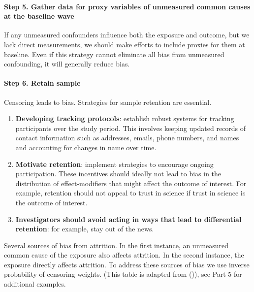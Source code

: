 \documentclass[
  singlecolumn]{article}
\let\oldparagraph\paragraph
\renewcommand{\paragraph}[1]{\oldparagraph{#1}\mbox{}}
\begin{document}
\paragraph{Step 5. Gather data for proxy variables of unmeasured common
causes at the baseline
wave}\label{step-5.-gather-data-for-proxy-variables-of-unmeasured-common-causes-at-the-baseline-wave}

If any unmeasured confounders influence both the exposure and outcome,
but we lack direct measurements, we should make efforts to include
proxies for them at baseline. Even if this strategy cannot eliminate all
bias from unmeasured confounding, it will generally reduce bias.

\paragraph{Step 6. Retain sample}\label{step-6.-retain-sample}

Censoring leads to bias. Strategies for sample retention are essential.

\begin{enumerate}
\def\labelenumi{\alph{enumi}.}
\item
  \textbf{Developing tracking protocols}: establish robust systems for
  tracking participants over the study period. This involves keeping
  updated records of contact information such as addresses, emails,
  phone numbers, and names and accounting for changes in name over time.
\item
  \textbf{Motivate retention}: implement strategies to encourage ongoing
  participation. These incentives should ideally not lead to bias in the
  distribution of effect-modifiers that might affect the outcome of
  interest. For example, retention should not appeal to trust in science
  if trust in science is the outcome of interest.
\item
  \textbf{Investigators should avoid acting in ways that lead to
  differential retention}: for example, stay out of the news.
\end{enumerate}

\begin{table}

\caption{\label{tbl-05}Several sources of bias from attrition. In the
first instance, an unmeasured common cause of the exposure also affects
attrition. In the second instance, the exposure directly affects
attrition. To address these sources of bias we use inverse probability
of censoring weights. (This table is adapted from
()), see Part 5 for
additional examples.}

\centering{

\threeFF

}

\end{table}%
\end{document}
